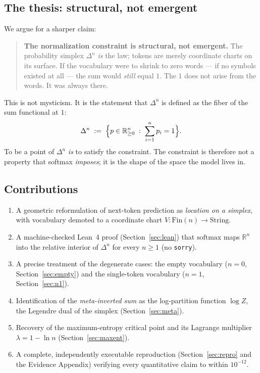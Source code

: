 \documentclass[11pt]{article}
\newcommand{\simplex}[1]{\Delta^{#1}}
\newcommand{\RR}{\mathbb{R}}
\newcommand{\softmax}{\mathrm{softmax}}
\begin{document}
\subsection{The thesis: structural, not emergent}
\label{sec:thesis}

We argue for a sharper claim:
\begin{quote}
\textbf{The normalization constraint is structural, not emergent.} The
probability simplex $\simplex{n}$ \emph{is} the law; tokens are merely
coordinate charts on its surface. If the vocabulary were to shrink to zero
words --- if no symbols existed at all --- the sum would \emph{still} equal
$1$. The $1$ does not arise from the words. It was always there.
\end{quote}
This is not mysticism. It is the statement that $\simplex{n}$ is defined as the
fiber of the sum functional at $1$:
\[
\simplex{n} \;:=\; \Bigl\{ p\in \RR^n_{\ge 0} \;:\; \sum_{i=1}^n p_i = 1 \Bigr\}.
\]
To be a point of $\simplex{n}$ \emph{is} to satisfy the constraint. The
constraint is therefore not a property that softmax \emph{imposes}; it is the
shape of the space the model lives in.

\subsection{Contributions}
\label{sec:contributions}

\begin{enumerate}
\item A geometric reformulation of next-token prediction as \emph{location on a
simplex}, with vocabulary demoted to a coordinate chart $V : \mathrm{Fin}(n)\to
\mathrm{String}$.
\item A machine-checked Lean~4 proof (Section~\ref{sec:lean}) that
$\softmax$ maps $\RR^n$ into the relative interior of $\simplex{n}$ for every
$n\ge 1$ (no \texttt{sorry}).
\item A precise treatment of the degenerate cases: the empty vocabulary
($n=0$, Section~\ref{sec:empty}) and the single-token vocabulary ($n=1$,
Section~\ref{sec:n1}).
\item Identification of the \emph{meta-inverted sum} as the log-partition
function $\log Z$, the Legendre dual of the simplex (Section~\ref{sec:meta}).
\item Recovery of the maximum-entropy critical point and its Lagrange
multiplier $\lambda = 1 - \ln n$ (Section~\ref{sec:maxent}).
\item A complete, independently executable reproduction (Section~\ref{sec:repro}
and the Evidence Appendix) verifying every quantitative claim to within
$10^{-12}$.
\end{enumerate}
\end{document}
